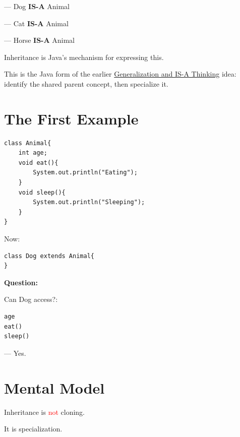 \documentclass[11pt,a4paper]{book}
\begin{document}
    --- Dog \textbf{IS-A} Animal


    --- Cat \textbf{IS-A} Animal

    --- Horse \textbf{IS-A} Animal


\textcolor{RosettaRoyalPurple}{Inheritance} is Java's mechanism for expressing this.

This is the Java form of the earlier \hyperref[chap:generalization]{Generalization and IS-A Thinking} idea: identify the shared parent concept, then specialize it.

\newpage
\section{The First Example}

\begin{verbatim}
class Animal{
    int age;
    void eat(){
        System.out.println("Eating");
    }
    void sleep(){
        System.out.println("Sleeping");
    }
}
\end{verbatim}


Now:

\begin{verbatim}
class Dog extends Animal{
}
\end{verbatim}


\textbf{\textbf{Question:}}

Can Dog access?:

\begin{verbatim}
age
eat()
sleep()
\end{verbatim}


 --- \textcolor{RosettaGreen}{Yes}.


\section{Mental Model}

\begin{mentalmodel}

\textcolor{RosettaRoyalPurple}{Inheritance} is \textcolor{red}{not} cloning.

It is specialization.

\end{mentalmodel}
\end{document}
